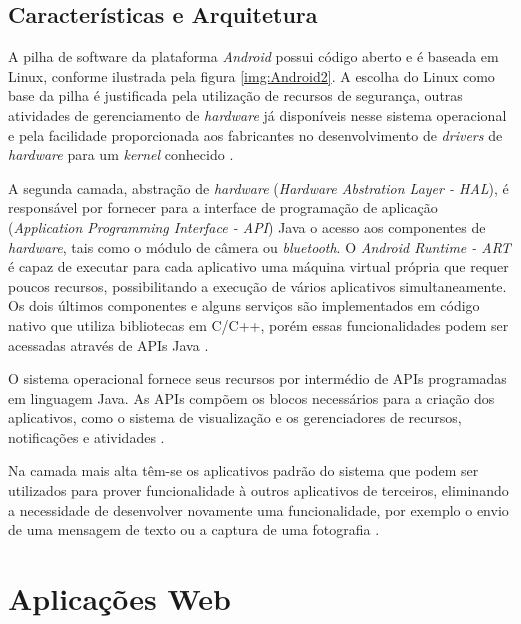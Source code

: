 \subsection{Características e Arquitetura}

A pilha de software da plataforma \textit{Android} possui código aberto e é baseada em Linux, conforme ilustrada pela figura \ref{img:Android2}. A escolha do Linux como base da pilha é justificada pela utilização de recursos de segurança, outras atividades de gerenciamento de \textit{hardware} já disponíveis nesse sistema operacional e pela facilidade proporcionada aos fabricantes no desenvolvimento de \textit{drivers} de \textit{hardware} para um \textit{kernel} conhecido \cite{SITEANDROID, gandhewar2010google}.


A segunda camada, abstração de \textit{hardware} (\textit{Hardware Abstration Layer - HAL}), é responsável por fornecer para a interface de programação de aplicação (\textit{Application Programming Interface - API}) Java o acesso aos componentes de \textit{hardware}, tais como o módulo de câmera ou \textit{bluetooth}. O \textit{Android Runtime - ART} é capaz de executar para cada aplicativo uma máquina virtual própria que requer poucos recursos, possibilitando a execução de vários aplicativos simultaneamente. Os dois últimos componentes e alguns serviços são implementados em código nativo que utiliza bibliotecas em C/C++, porém essas funcionalidades podem ser acessadas através de APIs Java \cite{SITEANDROID}.

O sistema operacional fornece seus recursos por intermédio de APIs programadas em linguagem Java. As APIs compõem os blocos necessários para a criação dos aplicativos, como o sistema de visualização e os gerenciadores de recursos, notificações e atividades \cite{SITEANDROID}.

Na camada mais alta têm-se os aplicativos padrão do sistema que podem ser utilizados para prover funcionalidade à outros aplicativos de terceiros, eliminando a necessidade de desenvolver novamente uma funcionalidade, por exemplo o envio de uma mensagem de texto ou a captura de uma fotografia \cite{SITEANDROID, saha2008developer}.

\section{Aplicações Web}

